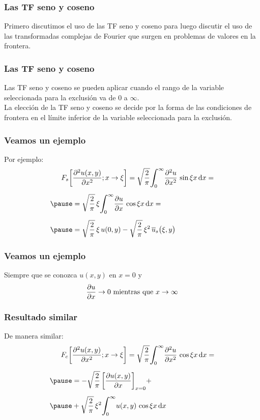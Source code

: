 \documentclass[12pt]{beamer}
\begin{document}
\begin{frame}
\frametitle{Las TF seno y coseno}
Primero discutimos el uso de las TF seno y coseno para luego discutir el uso de las transformadas complejas de Fourier que surgen en problemas de valores en la frontera.
\end{frame}
\begin{frame}
\frametitle{Las TF seno y coseno}
Las TF seno y coseno se pueden aplicar cuando el rango de la variable seleccionada para la exclusión va de $0$ a $\infty$.
\\
\bigskip
\pause
La elección de la TF seno y coseno se decide por la forma de las condiciones de frontera en el límite inferior de la variable seleccionada para la exclusión.
\end{frame}
\begin{frame}
\frametitle{Veamos un ejemplo}
Por ejemplo:
\pause
\begin{eqnarray}
\begin{aligned}[b]
F_{s} \bigg[ &\pdv[2]{u (x, y)}{x}; x \to \xi \bigg] = \sqrt{\dfrac{2}{\pi}} \scaleint{6ex}_{\bs 0}^{\infty} \pdv[2]{u}{x} \, \sin \xi x \dd{x} = \\[0.5em] \pause
&= \sqrt{\dfrac{2}{\pi}} \, \xi \scaleint{6ex}_{\bs 0}^{\infty} \pdv{u}{x} \, \cos \xi x \dd{x} = \\[0.5em] \pause
&= \sqrt{\dfrac{2}{\pi}} \, \xi \, u(0, y) - \sqrt{\dfrac{2}{\pi}} \, \xi^{2} \, \overline{u}_{s} \big( \xi, y  \big)
\end{aligned}
\label{eq:ecuacion_01_66}
\end{eqnarray}
\end{frame}
\begin{frame}
\frametitle{Veamos un ejemplo}
Siempre que se conozca $u (x, y)$ en $x = 0$ y
\begin{align*}
\pdv{u}{x} \to 0 \mbox{ mientras que } x \to \infty
\end{align*}
\end{frame}
\begin{frame}
\frametitle{Resultado similar}
De manera similar:
\pause
\begin{eqnarray}
\begin{aligned}[b]
F_{c} \bigg[ &\pdv[2]{u(x, y)}{x}; x \to \xi \bigg] = \sqrt{\dfrac{2}{\pi}} \scaleint{6ex}_{\bs 0}^{\infty} \pdv[2]{u}{x} \, \cos \xi x \dd{x} = \\[0.5em] \pause
&= - \sqrt{\dfrac{2}{\pi}} \, \bigg[ \pdv{u(x,y)}{x} \bigg]_{x=0} + \\[0.5em] \pause
&+ \sqrt{\dfrac{2}{\pi}} \, \xi^{2} \scaleint{6ex}_{\bs 0}^{\infty} u (x, y) \, \cos \xi x \dd{x}
\end{aligned}
\label{eq:ecuacion_01_67}
\end{eqnarray}
\end{frame}
\end{document}
